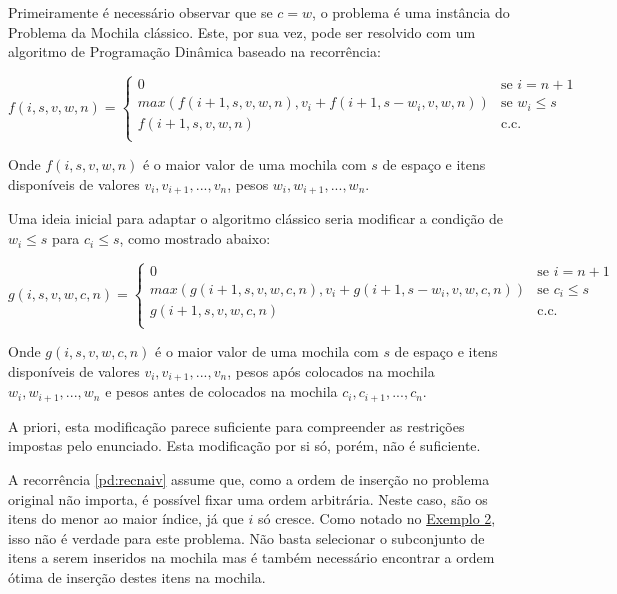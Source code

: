 Primeiramente é necessário observar que se $c = w$, o problema é uma instância do Problema da Mochila clássico. Este, por sua vez, pode ser resolvido com um algoritmo de Programação Dinâmica baseado na recorrência:

\begin{equation} \label{pd:recnaiv}
  f(i, s, v, w, n) =
  \begin{cases}
  0                                                             & \text{se $i = n + 1$} \\
  max(f(i + 1, s, v, w, n), v_i + f(i + 1, s - w_i, v, w, n))   & \text{se $w_i \leq s$} \\
  f(i + 1, s, v, w, n)                                          & \text{c.c.} \\
  \end{cases}
\end{equation}

Onde $f(i, s, v, w, n)$ é o maior valor de uma mochila com $s$ de espaço e itens disponíveis de valores $v_i, v_{i + 1}, ..., v_n$, pesos $w_i, w_{i + 1}, ..., w_n$.

Uma ideia inicial para adaptar o algoritmo clássico seria modificar a condição de $w_i \leq s$ para $c_i \leq s$, como mostrado abaixo:

\begin{equation} \label{pd:recok}
  g(i, s, v, w, c, n) =
  \begin{cases}
  0                                                                   & \text{se $i = n + 1$} \\
  max(g(i + 1, s, v, w, c, n), v_i + g(i + 1, s - w_i, v, w, c, n))   & \text{se $c_i \leq s$} \\
  g(i + 1, s, v, w, c, n)                                             & \text{c.c.} \\
  \end{cases}
\end{equation}

Onde $g(i, s, v, w, c, n)$ é o maior valor de uma mochila com $s$ de espaço e itens disponíveis de valores $v_i, v_{i + 1}, ..., v_n$, pesos após colocados na mochila $w_i, w_{i + 1}, ..., w_n$ e pesos antes de colocados na mochila $c_i, c_{i + 1}, ..., c_n$.

A priori, esta modificação parece suficiente para compreender as restrições impostas pelo enunciado. Esta modificação por si só, porém, não é suficiente. 

A recorrência \ref{pd:recnaiv} assume que, como a ordem de inserção no problema original não importa, é possível fixar uma ordem arbitrária. Neste caso, são os itens do menor ao maior índice, já que $i$ só cresce. Como notado no \hyperref[pd:ex2]{Exemplo 2}, isso não é verdade para este problema. Não basta selecionar o subconjunto de itens a serem inseridos na mochila mas é também necessário encontrar a ordem ótima de inserção destes itens na mochila.

